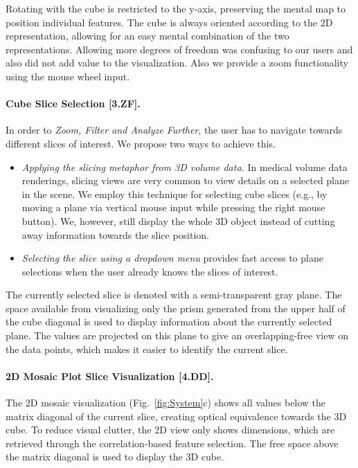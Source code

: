 \documentclass[journal]{style/vgtc} 			          %
\begin{document}
Rotating with the cube is restricted to the y-axis, preserving the mental map to position individual features.
The cube is always oriented according to the 2D representation, allowing for an easy mental combination of the two representations.
Allowing more degrees of freedom was confusing to our users and also did not add value to the visualization.
Also we provide a zoom functionality using the mouse wheel input.
\paragraph{Cube Slice Selection [3.ZF].}
In order to \emph{Zoom, Filter and Analyze Further}, the user has to navigate towards different slices of interest.
We propose two ways to achieve this.
\begin{itemize}
	\item \emph{Applying the slicing metaphor from 3D volume data.}
	In medical volume data renderings, slicing views are very common to view details on a selected plane in the scene.
	We employ this technique for selecting cube slices (e.g., by moving a plane via vertical mouse input while pressing the right mouse button).
	We, however, still display the whole 3D object instead of cutting away information towards the slice position.
	\item \emph{Selecting the slice using a dropdown menu} provides fast access to plane selections when the user already knows the slices of interest.
\end{itemize}
The currently selected slice is denoted with a semi-transparent gray plane.
The space available from visualizing only the prism generated from the upper half of the cube diagonal is used to display information about the currently selected plane.
The values are projected on this plane to give an overlapping-free view on the data points, which makes it easier to identify the current slice.
\paragraph{2D Mosaic Plot Slice Visualization [4.DD].}
The 2D mosaic visualization (Fig.~\ref{fig:System}c) shows all values below the matrix diagonal of the current slice, creating optical equivalence towards the 3D cube.
To reduce visual clutter, the 2D view only shows dimensions, which are retrieved through the correlation-based feature selection.
The free space above the matrix diagonal is used to display the 3D cube.
\end{document}

